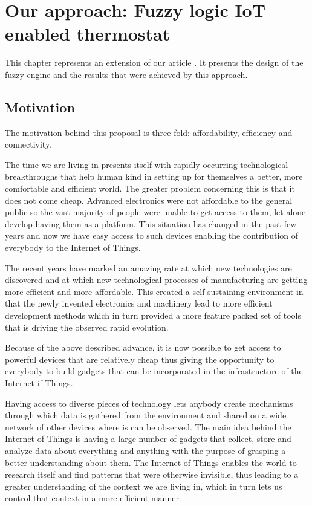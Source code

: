 \chapter{Our approach: Fuzzy logic IoT enabled thermostat}
\label{chap:concept}

This chapter represents an extension of our article \cite{FuzzyLogicIOT}. It presents the design of the fuzzy
engine and the results that were achieved by this approach.

\section{Motivation}

\qquad The motivation behind this proposal is three-fold: affordability, efficiency and connectivity.

\qquad The time we are living in presents itself with rapidly occurring technological breakthroughs that help human
kind in setting up for themselves a better, more comfortable and efficient world. The greater problem concerning
this is that it does not come cheap. Advanced electronics were not affordable to the general public so the vast
majority of people were unable to get access to them, let alone develop  having them as a platform. This
situation has changed in the past few years and now we have easy access to such devices enabling the
contribution of everybody to the Internet of Things.

\qquad The recent years have marked an amazing rate at which new technologies are discovered and at which new
technological processes of manufacturing are getting more efficient and more affordable. This created a self
sustaining environment in that the newly invented electronics and machinery lead to more efficient
development methods which in turn provided a more feature packed set of tools that is driving the observed
rapid evolution.

Because of the above described advance, it is now possible to get access to powerful devices that are
relatively cheap thus giving the opportunity to everybody to build gadgets that can be incorporated
in the infrastructure of the Internet if Things.

\qquad Having access to diverse pieces of technology lets anybody create mechanisms through which data is gathered
from the environment and shared on a wide network of other devices where is can be observed.
The main idea behind the Internet of Things is having a large number of gadgets that collect, store and
analyze data about everything and anything with the purpose of grasping a better understanding about them.
The Internet of Things enables the world to research itself and find patterns that were otherwise invisible,
thus leading to a greater understanding of the context we are living in, which in turn lets us control that
context in a more efficient manner.

